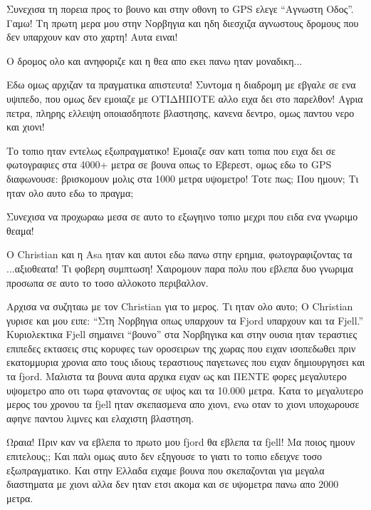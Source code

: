 
Συνεχισα τη πορεια προς το βουνο και στην οθονη το GPS ελεγε ``Αγνωστη Οδος''. Γαμω! Τη πρωτη μερα μου στην Νορβηγια και ηδη διεσχιζα αγνωστους δρομους που δεν υπαρχουν καν στο χαρτη! Αυτα ειναι! 


Ο δρομος ολο και ανηφοριζε και η θεα απο εκει πανω ηταν μοναδικη...


Εδω ομως αρχιζαν τα πραγματικα απιστευτα!
Συντομα η διαδρομη με εβγαλε σε ενα υψιπεδο, που ομως δεν εμοιαζε με ΟΤΙΔΗΠΟΤΕ αλλο ειχα δει στο παρελθον!
Αγρια πετρα, πληρης ελλειψη οποιασδηποτε βλαστησης, κανενα δεντρο, ομως παντου νερο και χιονι! 


Το τοπιο ηταν εντελως εξωπραγματικο! Εμοιαζε σαν κατι τοπια που ειχα δει σε φωτογραφιες στα 4000+ μετρα σε βουνα οπως το Εβερεστ, ομως εδω το GPS διαφωνουσε: βρισκομουν μολις στα 1000 μετρα υψομετρο! 
Τοτε πως; Που ημουν; Τι ηταν ολο αυτο εδω το πραγμα;


Συνεχισα να προχωραω μεσα σε αυτο το εξωγηινο τοπιο μεχρι που ειδα ενα γνωριμο θεαμα!


Ο Christian και η Asa ηταν και αυτοι εδω πανω στην ερημια, φωτογραφιζοντας τα ...αξιοθεατα!
Τι φοβερη συμπτωση! Χαιρομουν παρα πολυ που εβλεπα δυο γνωριμα προσωπα σε αυτο το τοσο αλλοκοτο περιβαλλον. 


Αρχισα να συζηταω με τον Christian για το μερος. Τι ηταν ολο αυτο; 
Ο Christian γυρισε και μου ειπε: ``Στη Νορβηγια οπως υπαρχουν τα Fjord υπαρχουν και τα Fjell.''
Κυριολεκτικα Fjell σημαινει ``βουνο'' στα Νορβηγικα και στην ουσια ηταν τεραστιες επιπεδες εκτασεις στις κορυφες των οροσειρων της χωρας που ειχαν ισοπεδωθει πριν εκατομμυρια χρονια απο τους ιδιους τεραστιους παγετωνες που ειχαν δημιουργησει και τα fjord. Μαλιστα τα βουνα αυτα αρχικα ειχαν ως και ΠΕΝΤΕ φορες μεγαλυτερο υψομετρο απο οτι τωρα φτανοντας σε υψος και τα 10.000 μετρα.
Κατα το μεγαλυτερο μερος του χρονου τα fjell ηταν σκεπασμενα απο χιονι, ενω οταν το χιονι υποχωρουσε αφηνε παντου λιμνες και ελαχιστη βλαστηση.

Ωραια! Πριν καν να εβλεπα το πρωτο μου fjord θα εβλεπα τα fjell! Μα ποιος ημουν επιτελους;; 
Και παλι ομως αυτο δεν εξηγουσε το γιατι το τοπιο εδειχνε τοσο εξωπραγματικο. Και στην Ελλαδα ειχαμε βουνα που σκεπαζονται για μεγαλα διαστηματα με χιονι αλλα δεν ηταν ετσι ακομα και σε υψομετρα πανω απο 2000 μετρα. 

